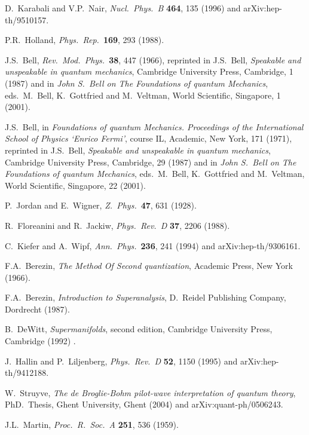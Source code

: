 \documentclass[12pt]{article}
\begin{document}
\begin{thebibliography}{100}
{D.\ Karabali and V.P.\ Nair, {\em Nucl.\ Phys.\ B} {\bf 464}, 135 (1996) and
  arXiv:hep-th/9510157.}

{P.R.\ Holland, {\em Phys.\ Rep.}\ {\bf 169}, 293 (1988).}

{J.S.\ Bell, {\em Rev.\ Mod.\ Phys.}\ {\bf 38}, 447 (1966), reprinted in J.S.\
  Bell, {\em Speakable and unspeakable in quantum mechanics}, Cambridge
  University Press, Cambridge, 1 (1987) and in {\em John S.\ Bell on The
  Foundations of quantum Mechanics}, eds.\ M.\ Bell, K.\ Gottfried and M.\
  Veltman, World Scientific, Singapore, 1 (2001).}

{J.S.\ Bell, in {\em Foundations of quantum Mechanics. Proceedings of the
  International School of Physics `Enrico Fermi'}, course IL, Academic, New
  York, 171 (1971), reprinted in J.S.\ Bell, {\em Speakable and unspeakable in
  quantum mechanics}, Cambridge University Press, Cambridge, 29 (1987) and in
  {\em John S.\ Bell on The Foundations of quantum Mechanics}, eds.\ M.\ Bell,
  K.\ Gottfried and M.\ Veltman, World Scientific, Singapore, 22 (2001).}

\bibitem{jordan28}
{P.\ Jordan and E.\ Wigner, {\em Z.\ Phys.}\ {\bf 47}, 631 (1928).}

\bibitem{floreanini88}
{R.\ Floreanini and R.\ Jackiw, {\em Phys.\ Rev.\ D} {\bf 37}, 2206 (1988).}

\bibitem{kiefer94}
{C.\ Kiefer and A.\ Wipf, {\em Ann.\ Phys.}\ {\bf 236}, 241 (1994) and
  arXiv:hep-th/9306161.}

{F.A.\ Berezin, {\em The Method Of Second quantization}, Academic Press, New
  York (1966).}

{F.A.\ Berezin, {\em Introduction to Superanalysis}, D.\ Reidel Publishing
  Company, Dordrecht (1987).}

{B.\ DeWitt, {\em Supermanifolds}, second edition, Cambridge University Press,
  Cambridge (1992) .}

{J.\ Hallin and P.\ Liljenberg, {\em Phys.\ Rev.\ D} {\bf 52}, 1150 (1995) and
  arXiv:hep-th/9412188.}

{W.\ Struyve, {\em The de Broglie-Bohm pilot-wave interpretation of quantum
  theory}, PhD.\ Thesis, Ghent University, Ghent (2004) and
  arXiv:quant-ph/0506243.}

{J.L.\ Martin, {\em Proc.\ R.\ Soc.\ A} {\bf 251}, 536 (1959).}


\end{thebibliography}
\end{document}
